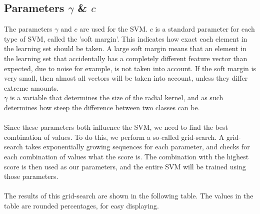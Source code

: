 \documentclass[a4paper]{article}
\begin{document}
\subsection{Parameters $\gamma$ \& $c$}

The parameters $\gamma$ and $c$ are used for the SVM. $c$ is a standard
parameter for each type of SVM, called the 'soft margin'. This indicates how
exact each element in the learning set should be taken. A large soft margin
means that an element in the learning set that accidentally has a completely
different feature vector than expected, due to noise for example, is not taken
into account. If the soft margin is very small, then almost all vectors will be
taken into account, unless they differ extreme amounts.\\
$\gamma$ is a variable that determines the size of the radial kernel, and as
such determines how steep the difference between two classes can be.\\
\\
Since these parameters both influence the SVM, we need to find the best
combination of values. To do this, we perform a so-called grid-search. A
grid-search takes exponentially growing sequences for each parameter, and
checks for each combination of values what the score is. The combination with
the highest score is then used as our parameters, and the entire SVM will be
trained using those parameters.\\
\\
The results of this grid-search are shown in the following table. The values
in the table are rounded percentages, for easy displaying.
\end{document}
